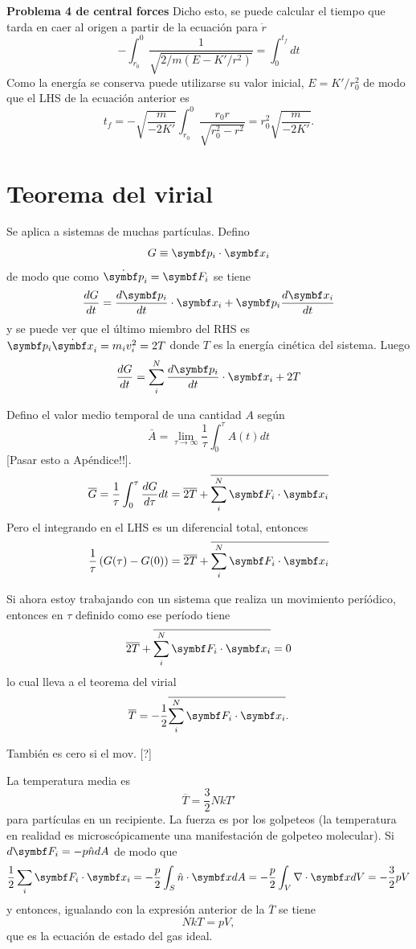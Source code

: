\documentclass[10pt,oneside]{CBFT_book}
\begin{document}
\begin{ejemplo}{\bf Problema 4 de central forces}
Dicho esto, se puede calcular el tiempo que tarda en caer al origen a partir de la ecuación para $\dot{r}$
\[
	-\int_{r_0}^0 \frac{1}{\sqrt{ 2/m ( E - K'/r^2 ) }} = \int_0^{t_f} dt
\]
Como la energía se conserva puede utilizarse su valor inicial, $E=K'/r_0^2$ de modo que el LHS de la ecuación anterior es
\[
	t_f = -\sqrt{ \frac{m}{-2K'} } \int_{r_0}^0 \frac{ r_0 r }{\sqrt{ r_0^2 - r^2 }} = r_0^2 \sqrt{\frac{m}{-2K'}}.
\]
\end{ejemplo}

\section{Teorema del virial}

Se aplica a sistemas de muchas partículas. Defino 
\[
	G \equiv \vb{p}_i \cdot \vb{x}_i
\]
de modo que como $ \dot{\vb{p}}_i = \vb{F}_i $ se tiene 
\[
	\dtot{G}{t} = \dtot{\vb{p}_i}{t} \cdot \vb{x}_i + \vb{p}_i \dtot{\vb{x}_i}{t}
\]
y se puede ver que el último miembro del RHS es $ \vb{p}_i \dot{\vb{x}}_i = m_i v_i^2 = 2T$ donde $T$ es la energía cinética del sistema.
Luego 
\[
	\dtot{G}{t} = \sum_i^N \dtot{\vb{p}_i}{t} \cdot \vb{x}_i + 2 T
\]

Defino el valor medio temporal de una cantidad $A$ según 
\[
	\bar{A} = \lim_{\tau \to \infty} \frac{1}{\tau} \int_0^\tau A(t) dt
\]
[Pasar esto a Apéndice!!].
\[
	\overline{G} = \frac{1}{\tau} \int_0^\tau \dtot{G}{\tau} dt = \overline{ 2 T } + \overline{ \sum_i^N \vb{F}_i \cdot \vb{x}_i }
\]
Pero el integrando en el LHS es un diferencial total, entonces 
\[
	\frac{1}{\tau} \left( G(\tau) - G(0) \right) = \overline{ 2 T } + \overline{ \sum_i^N \vb{F}_i \cdot \vb{x}_i }
\]

Si ahora estoy trabajando con un sistema que realiza un movimiento períódico, entonces en $\tau$ definido como ese período tiene 
\[
	\overline{ 2 T } + \overline{ \sum_i^N \vb{F}_i \cdot \vb{x}_i } = 0
\]
lo cual lleva a el teorema del virial
\[
	\overline{ T }  = - \frac{1}{2} \overline{ \sum_i^N \vb{F}_i \cdot \vb{x}_i }.
\]

También es cero si el mov. [?]

La temperatura media es 
\[
	\overline{T} = \frac 3 2 N k T'
\]
para partículas en un recipiente. La fuerza es por los golpeteos (la temperatura en realidad es microscópicamente una manifestación de golpeteo 
molecular). Si $ d\vb{F}_i = - p \hat{n}dA $ de modo que 
\[
	\frac{1}{2} \sum_i \vb{F}_i \cdot \vb{x}_i = -\frac{p}{2}\int_S \hat{n}\cdot\vb{x}dA =
	-\frac{p}{2} \int_V \nabla\cdot \vb{x} dV = - \frac{3}{2} p V
\]
y entonces, igualando con la expresión anterior de la $\overline{T}$ se tiene 
\[
	N k T = p V,
\]
que es la ecuación de estado del gas ideal.
\end{document}
